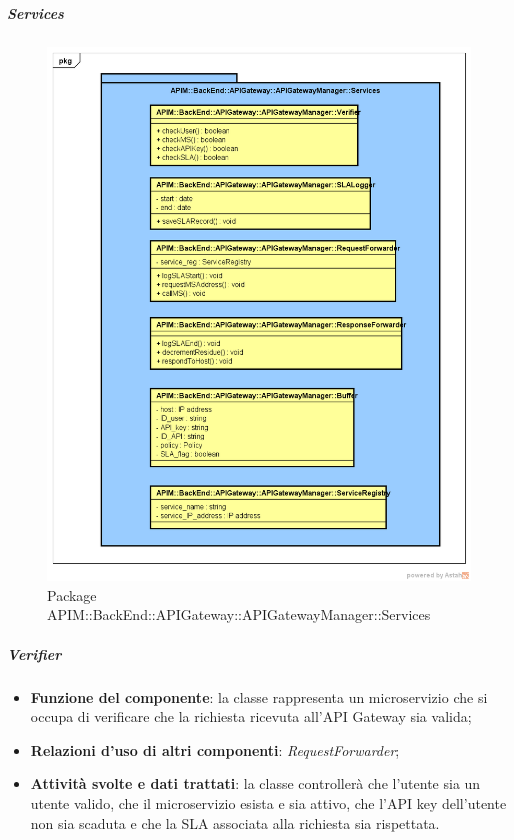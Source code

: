 \subparagraph{Services}
\begin{figure}[H]
	\centering
	\includegraphics[scale=0.45]{UML/DiagrammiPackage/APIGatewayManagerServices.png}
	\caption{Package APIM::BackEnd::APIGateway::APIGatewayManager::Services}
\end{figure}
\FloatBarrier

\subparagraph{Verifier}
\begin{itemize}
	\item \textbf{Funzione del componente}: la classe rappresenta un microservizio che si occupa di verificare che la richiesta ricevuta all'API Gateway sia valida;
	\item \textbf{Relazioni d'uso di altri componenti}: \textit{RequestForwarder};
	\item \textbf{Attivit\`{a} svolte e dati trattati}: la classe controller\`{a} che l'utente sia un utente valido, che il microservizio esista e sia attivo, che l'API key dell'utente non sia scaduta e che la SLA associata alla richiesta sia rispettata.
\end{itemize}

